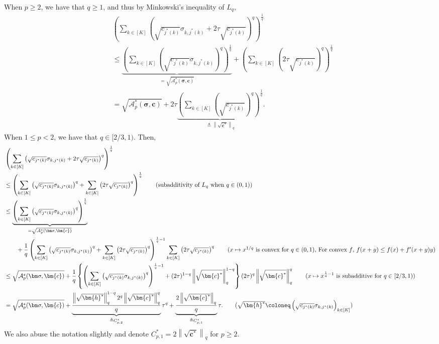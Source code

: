 \documentclass{article}
\def\vc{{\bm{c}}}
\def\vh{{\bm{h}}}
\def\gA{{\mathcal{A}}}
\theoremstyle{plain}
\theoremstyle{definition}
\theoremstyle{plain}
\newcommand{\bignorm}[1]{\left\lVert #1 \right\rVert}
\begin{document}
When $p \geq 2$, we have that $q \geq 1$, and thus by Minkowski's inequality of $L_q$,
\begin{align}
    &\left( \sum_{k\in[K]} \left( \sqrt{c_{j^*(k)}} \sigma_{k,j^*(k)} + 2 \tau \sqrt{c_{j^*(k)}} \right)^q \right)^{\frac{1}{q}} \\
    &\leq \underbrace{\left( \sum_{k\in[K]} \left( \sqrt{c_{j^*(k)}} \sigma_{k,j^*(k)} \right)^q \right)^{\frac{1}{q}}}_{= \sqrt{\gA_p^*(\bm\sigma, \vc)}} + \left( \sum_{k\in[K]} \left( 2 \tau \sqrt{c_{j^*(k)}} \right)^q \right)^{\frac{1}{q}} \\
    &= \sqrt{\gA_p^*(\bm\sigma, \vc)} + 2 \tau \underbrace{\left( \sum_{k\in[K]} \left( \sqrt{c_{j^*(k)}} \right)^q \right)^{\frac{1}{q}}}_{\triangleq \bignorm{\sqrt{\vc^*}}_{q}}.
\end{align}
When $1 \leq p < 2$, we have that $q \in [2/3, 1)$.
Then,
\begin{align}
    &\left( \sum_{k\in[K]} \left( \sqrt{c_{j^*(k)}} \sigma_{k,j^*(k)} + 2 \tau \sqrt{c_{j^*(k)}} \right)^q \right)^{\frac{1}{q}} \\
    &\leq \left( \sum_{k\in[K]} \left( \sqrt{c_{j^*(k)}} \sigma_{k,j^*(k)} \right)^q + \sum_{k\in[K]} \left( 2 \tau \sqrt{c_{j^*(k)}} \right)^q \right)^{\frac{1}{q}} \tag{subadditivity of $L_q$ when $q \in (0, 1)$} \\
    &\leq \underbrace{\left( \sum_{k\in[K]} \left( \sqrt{c_{j^*(k)}} \sigma_{k,j^*(k)} \right)^q \right)^{\frac{1}{q}}}_{= \sqrt{\gA_p^*(\bm\sigma, \vc)}} \\
    &\quad\quad + \frac{1}{q} \left( \sum_{k\in[K]} \left( \sqrt{c_{j^*(k)}} \sigma_{k,j^*(k)} \right)^q + \sum_{k\in[K]} \left( 2 \tau \sqrt{c_{j^*(k)}} \right)^q \right)^{\frac{1}{q} - 1} \sum_{k\in[K]} \left( 2 \tau \sqrt{c_{j^*(k)}} \right)^q \tag{$x \mapsto x^{1/q}$ is convex for $q \in (0, 1)$, For convex $f$, $f(x + y) \leq f(x) + f'(x + y) y$} \\
    &\leq \sqrt{\gA_p^*( \bm\sigma, \vc)} + \frac{1}{q} \left\{ \left( \sum_{k\in[K]} \left( \sqrt{c_{j^*(k)}} \sigma_{k,j^*(k)} \right)^q \right)^{\frac{1}{q} - 1} + (2 \tau)^{1 - q} \bignorm{\sqrt{\vc^*}}_q^{1-q} \right\} (2 \tau)^q \bignorm{\sqrt{\vc^*}}_q^q \tag{$x \mapsto x^{\frac{1}{q} - 1}$ is subadditive for $q \in [2/3, 1)$} \\
    &= \sqrt{\gA_p^*(\bm\sigma, \vc)} + \underbrace{\frac{\bignorm{\sqrt{\vh^*}}_q^{1-q} 2^q \bignorm{\sqrt{\vc^*}}_q^q}{q}}_{\triangleq C_{p,2}^*} \tau^q + \underbrace{\frac{2 \bignorm{\sqrt{\vc^*}}_q}{q}}_{\triangleq C_{p,1}^*} \tau. \tag{$\sqrt{\vh^*} \coloneq \left( \sqrt{c_{j^*(k)}} \sigma_{k,j^*(k)} \right)_{k \in [K]}$}
\end{align}
We also abuse the notation slightly and denote $C_{p,1}^* = 2 \bignorm{\sqrt{\vc^*}}_q$ for $p \geq 2$.
\end{document}
